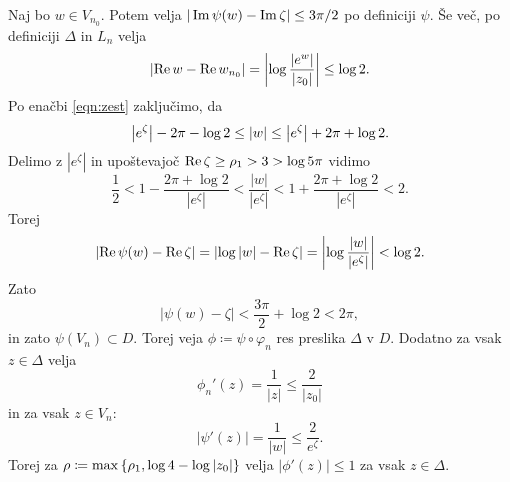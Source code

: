 \begin{dokaz}
    Naj bo \(w \in V_{n_0}\). Potem velja \(|\operatorname{Im} \psi (w) - \operatorname{Im} \zeta| \leq 3 \pi / 2\) po definiciji \(\psi\). Še več, po definiciji \(\Delta\) in \(L_n\) velja
    \[\left\lvert\operatorname{Re} w - \operatorname{Re} w_{n_0}\right\rvert = \left\lvert\log \frac{|e^w|}{|z_0|}\right\rvert \leq \log 2.\]
    Po enačbi \eqref{eqn:zest} zaključimo, da
    \[\left\lvert e^{\zeta}\right\rvert - 2 \pi - \log 2 \leq |w| \leq \left\lvert e^{\zeta}\right\rvert + 2 \pi + \log 2.\]
    Delimo z \(|e^{\zeta}|\) in upoštevajoč \(\operatorname{Re} \zeta \geq \rho_1 > 3 > \log 5 \pi\) vidimo
    \[\frac{1}{2} < 1 - \frac{2 \pi + \log 2}{|e^{\zeta}|} < \frac{|w|}{|e^{\zeta}|} < 1 + \frac{2 \pi + \log 2}{|e^{\zeta}|} < 2.\]
    Torej
    \[\left\lvert\operatorname{Re} \psi (w) - \operatorname{Re} \zeta\right\rvert = \left\lvert\log |w| - \operatorname{Re} \zeta\right\rvert = \left\lvert\log \frac{|w|}{|e^{\zeta}|}\right\rvert < \log 2.\]
    Zato
    \[|\psi (w) - \zeta| < \frac{3 \pi}{2} + \log 2 < 2 \pi,\]
    in zato \(\psi (V_n) \subset D\). Torej veja \(\phi \coloneq \psi \circ \varphi_n\) res preslika \(\Delta\) v \(D\). Dodatno za vsak \(z \in \Delta\) velja
    \[\phi_{n}' (z) = \frac{1}{|z|} \leq \frac{2}{|z_0|}\]
    in za vsak \(z \in V_n\):
    \[|\psi' (z)| = \frac{1}{|w|} \leq \frac{2}{e^{\zeta}}.\]
    Torej za \(\rho \coloneq \max \left\{ \rho_1, \log 4 - \log |z_0| \right\}\) velja \(|\phi' (z)| \leq 1\) za vsak \(z \in \Delta\).
\end{dokaz}

